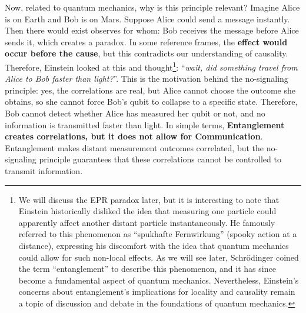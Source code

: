 \highspace
Now, related to quantum mechanics, why is this principle relevant? Imagine Alice is on Earth and Bob is on Mars. Suppose Alice could send a message instantly. Then there would exist observes for whom: Bob receives the message before Alice sends it, which creates a paradox. In some reference frames, the \textbf{effect would occur before the cause}, but this contradicts our understanding of causality. Therefore, Einstein looked at this and thought\footnote{
    We will discuss the EPR paradox later, but it is interesting to note that Einstein historically disliked the idea that measuring one particle could apparently affect another distant particle instantaneously. He famously referred to this phenomenon as ``spukhafte Fernwirkung'' (spooky action at a distance), expressing his discomfort with the idea that quantum mechanics could allow for such non-local effects. As we will see later, Schrödinger coined the term ``entanglement'' to describe this phenomenon, and it has since become a fundamental aspect of quantum mechanics. Nevertheless, Einstein's concerns about entanglement's implications for locality and causality remain a topic of discussion and debate in the foundations of quantum mechanics.
}: ``\emph{wait, did something travel from Alice to Bob faster than light?}''. This is the motivation behind the no-signaling principle: yes, the correlations are real, but Alice cannot choose the outcome she obtains, so she cannot force Bob's qubit to collapse to a specific state. Therefore, Bob cannot detect whether Alice has measured her qubit or not, and no information is transmitted faster than light. In simple terms, \textbf{Entanglement creates correlations, but it does not allow for Communication}. Entanglement makes distant measurement outcomes correlated, but the no-signaling principle guarantees that these correlations cannot be controlled to transmit information.